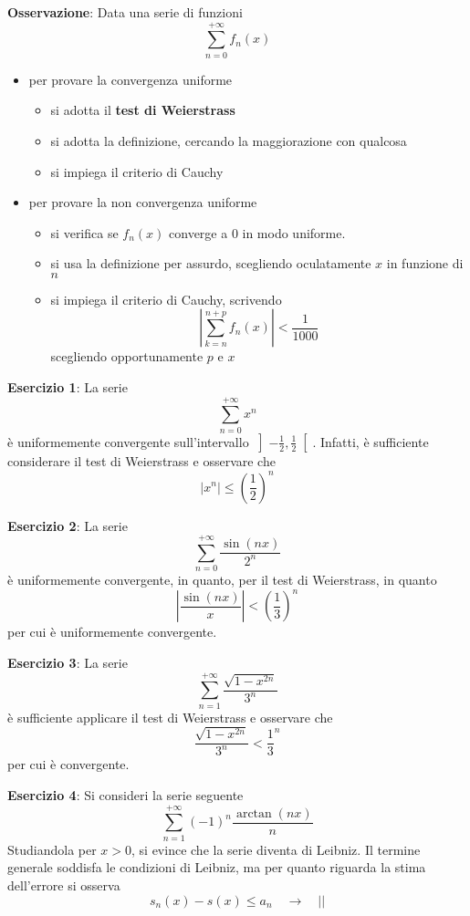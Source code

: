 \documentclass[a4paper]{extarticle}
\begin{document}
\vspace{1em}
\noindent
\textbf{Osservazione}: Data una serie di funzioni
\[\sum_{n=0}^{+\infty} f_n(x)\]
\begin{itemize}
    \item per provare la convergenza uniforme
    \begin{itemize}
        \item si adotta il \textbf{test di Weierstrass}
        \item si adotta la definizione, cercando la maggiorazione con qualcosa
        \item si impiega il criterio di Cauchy
    \end{itemize}
    \item per provare la non convergenza uniforme
    \begin{itemize}
        \item si verifica se $f_n(x)$ converge a $0$ in modo uniforme.
        \item si usa la definizione per assurdo, scegliendo oculatamente $x$ in funzione di $n$
        \item si impiega il criterio di Cauchy, scrivendo
        \[\left \vert \sum_{k=n}^{n+p} f_n(x) \right \vert < \frac{1}{1000}\]
        scegliendo opportunamente $p$ e $x$
    \end{itemize}
\end{itemize}

\vspace{1em}
\noindent
\textbf{Esercizio 1}: La serie
\[\sum_{n=0}^{+\infty} x^n\]
è uniformemente convergente sull'intervallo $\left] - \frac{1}{2}, \frac{1}{2}\right[$. Infatti, è sufficiente considerare il test di Weierstrass e osservare che
\[\left \vert x^n \right \vert \leq \left(\frac{1}{2}\right)^n\]

\vspace{1em}
\noindent
\textbf{Esercizio 2}: La serie
\[\sum_{n=0}^{+\infty} \frac{\sin(nx)}{2^n}\]
è uniformemente convergente, in quanto, per il test di Weierstrass, in quanto
\[\left \vert \frac{\sin(nx)}{x} \right \vert < \left(\frac{1}{3}\right)^n\]
per cui è uniformemente convergente.

\vspace{1em}
\noindent
\textbf{Esercizio 3}: La serie
\[\sum_{n=1}^{+\infty} \frac{\sqrt{1-x^{2n}}}{3^n}\]
è sufficiente applicare il test di Weierstrass e osservare che
\[\frac{\sqrt{1-x^{2n}}}{3^n} < \frac{1}{3}^n\]
per cui è convergente.


\vspace{1em}
\noindent
\textbf{Esercizio 4}: Si consideri la serie seguente
\[\sum_{n=1}^{+\infty} (-1)^n \frac{\arctan(nx)}{n}\]
Studiandola per $x>0$, si evince che la serie diventa di Leibniz. Il termine generale soddisfa le condizioni di Leibniz, ma per quanto riguarda la stima dell'errore si osserva
\[s_n(x)-s(x) \leq a_n \hspace{1em} \rightarrow \hspace{1em} \left \vert \right \vert\]
\end{document}

